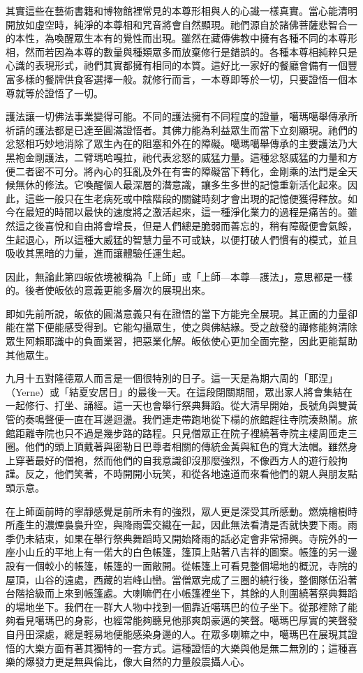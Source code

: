其實這些在藝術書籍和博物館裡常見的本尊形相與人的心識一樣真實。當心能清明開放如虛空時，純淨的本尊相和咒音將會自然顯現。祂們源自於諸佛菩薩悲智合一的本性，為喚醒眾生本有的覺性而出現。雖然在藏傳佛教中擁有各種不同的本尊形相，然而若因為本尊的數量與種類眾多而放棄修行是錯誤的。各種本尊相純粹只是心識的表現形式，祂們其實都擁有相同的本質。這好比一家好的餐廳會備有一個豐富多樣的餐牌供食客選擇一般。就修行而言，一本尊即等於一切，只要證悟一個本尊就等於證悟了一切。

護法讓一切佛法事業變得可能。不同的護法擁有不同程度的證量，噶瑪噶舉傳承所祈請的護法都是已達至圓滿證悟者。其佛力能為利益眾生而當下立刻顯現。祂們的忿怒相巧妙地消除了眾生內在的阻塞和外在的障礙。噶瑪噶舉傳承的主要護法乃大黑袍金剛護法，二臂瑪哈嘎拉，祂代表忿怒的威猛力量。這種忿怒威猛的力量和方便二者密不可分。將內心的狂亂及外在有害的障礙當下轉化，金剛乘的法門是全天候無休的修法。它喚醒個人最深層的潛意識，讓多生多世的記憶重新活化起來。因此，這些一般只在生老病死或中陰階段的關鍵時刻才會出現的記憶便獲得釋放。如今在最短的時間以最快的速度將之激活起來，這一種淨化業力的過程是痛苦的。雖然這之後喜悅和自由將會增長，但是人們總是脆弱而善忘的，稍有障礙便會氣餒，生起退心，所以這種大威猛的智慧力量不可或缺，以便打破人們慣有的模式，並且吸收其黑暗的力量，進而讓體驗任運生起。

因此，無論此第四皈依境被稱為「上師」或「上師---本尊---護法」，意思都是一樣的。後者使皈依的意義更能多層次的展現出來。

即如先前所說，皈依的圓滿意義只有在證悟的當下方能完全展現。其正面的力量卻能在當下便能感受得到。它能勾攝眾生，使之與佛結緣。受之啟發的禪修能夠清除眾生阿賴耶識中的負面業習，把惡業化解。皈依使心更加全面完整，因此更能幫助其他眾生。

九月十五對隆德眾人而言是一個很特別的日子。這一天是為期六周的「耶涅」（Yerne）或「結夏安居日」的最後一天。在這段閉關期間，眾出家人將會集結在一起修行、打坐、誦經。這一天也會舉行祭典舞蹈。從大清早開始，長號角與雙黃管的奏鳴聲便一直在耳邊迴盪。我們連走帶跑地從下榻的旅館趕往寺院湊熱鬧。旅館距離寺院也只不過是幾步路的路程。只見僧眾正在院子裡繞著寺院主樓周匝走三圈。他們的頭上頂戴著與密勒日巴尊者相關的傳統金黃與紅色的寬大法帽。雖然身上穿著最好的僧袍，然而他們的自我意識卻沒那麼強烈，不像西方人的遊行般拘謹。反之，他們笑著，不時開開小玩笑，和從各地遠道而來看他們的親人與朋友點頭示意。

在上師面前時的寧靜感覺是前所未有的強烈，眾人更是深受其所感動。燃燒檜樹時所產生的濃煙裊裊升空，與降雨雲交織在一起，因此無法看清是否就快要下雨。雨季仍未結束，如果在舉行祭典舞蹈時又開始降雨的話必定會非常掃興。寺院外的一座小山丘的平地上有一偌大的白色帳篷，篷頂上貼著八吉祥的圖案。帳篷的另一邊設有一個較小的帳篷，帳篷的一面敞開。從帳篷上可看見整個場地的概況，寺院的屋頂，山谷的遠處，西藏的岩峰山巒。當僧眾完成了三圈的繞行後，整個隊伍沿著台階拾級而上來到帳篷處。大喇嘛們在小帳篷裡坐下，其餘的人則圍繞著祭典舞蹈的場地坐下。我們在一群大人物中找到一個靠近噶瑪巴的位子坐下。從那裡除了能夠看見噶瑪巴的身影，也經常能夠聽見他那爽朗豪邁的笑聲。噶瑪巴厚實的笑聲發自丹田深處，總是輕易地便能感染身邊的人。在眾多喇嘛之中，噶瑪巴在展現其證悟的大樂方面有著其獨特的一套方式。這種證悟的大樂與他是無二無別的；這種喜樂的爆發力更是無與倫比，像大自然的力量般震攝人心。

